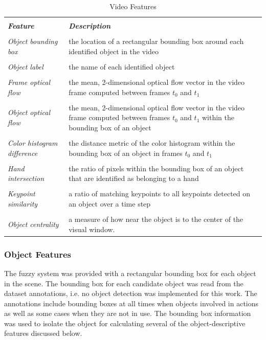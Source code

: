 \documentclass[12pt]{report}
\begin{document}
\begin{table}
\caption{Video Features}
\begin{center}
\begin{tabular}{p{5cm}p{7cm}}
\hline \\
\textbf{\textit{Feature}}&\textbf{\textit{Description}} \\
\hline
\hline \\
\textit{Object bounding box} & the location of a rectangular bounding box around each identified object in the video \\ \\
\textit{Object label} & the name of each identified object \\ \\
\textit{Frame optical flow} & the mean, 2-dimensional optical flow vector in the video frame computed between frames $t_0$ and $t_1$\\ \\
\textit{Object optical flow} & the mean, 2-dimensional optical flow vector in the video frame computed between frames $t_0$ and $t_1$ within the bounding box of an object \\ \\
\textit{Color histogram difference} & the distance metric of the color histogram within the bounding box of an object in frames $t_0$ and $t_1$ \\ \\
\textit{Hand intersection} & the ratio of pixels within the bounding box of an object that are identified as belonging to a hand \\ \\
\textit{Keypoint similarity} & a ratio of matching keypoints to all keypoints detected on an object over a time step \\ \\
\textit{Object centrality} & a measure of how near the object is to the center of the visual window. \\
\hline
\end{tabular}
\label{videoFeatures}
\end{center}
\end{table}

\subsubsection{Object Features}
The fuzzy system was provided with a rectangular bounding box for each object in the scene. The bounding box for each candidate object was read from the dataset annotations, i.e. no object detection was implemented for this work. The annotations include bounding boxes at all times when objects involved in actions as well as some cases when they are not in use. The bounding box information was used to isolate the object for calculating several of the object-descriptive features discussed below.
\end{document}

